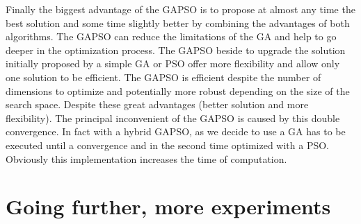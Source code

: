 Finally the biggest advantage of the GAPSO is to propose at almost any time the best solution and some time slightly better by combining the advantages of both algorithms. 
The GAPSO can reduce the limitations of the GA and help to go deeper in the optimization process. The GAPSO  beside to upgrade the solution initially proposed by a simple GA or PSO offer more flexibility and allow only one solution to be efficient. The GAPSO is efficient despite the number of dimensions to optimize and potentially more robust depending on the size of the search space.
Despite these great advantages (better solution and more flexibility).
The principal inconvenient of the GAPSO is caused by this double convergence. In fact with a hybrid GAPSO, as we decide to use a GA has to be executed until a convergence and in the second time optimized with a PSO. Obviously this implementation increases the time of computation.
 
   
		
\section{Going further, more experiments }\label{sec:GoingFurtherWaypointPose}

